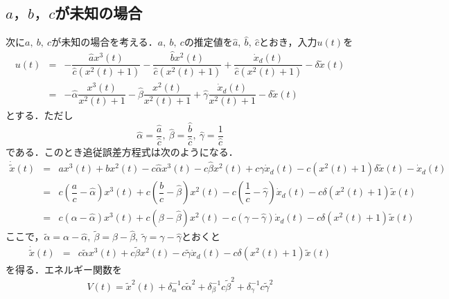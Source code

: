 \documentclass[a4paper,12pt]{jarticle}
\begin{document}
\subsection{$ a，b，c $が未知の場合}
次に$ a, ~ b, ~ c $が未知の場合を考える．$ a, ~ b, ~ c $の推定値を$ \hat{a}, ~ \hat{b}, ~ \hat{c} $とおき，入力$ u(t) $を
\begin{eqnarray}
 u(t) & = & -\dfrac{\hat{a}x^3(t)}{\hat{c}\left( x^2(t) + 1 \right)} - \dfrac{\hat{b}x^2(t)}{\hat{c}\left( x^2(t) + 1 \right)} +\dfrac{\dot{x}_d(t)}{\hat{c}\left( x^2(t) + 1 \right)} - \delta \tilde{x}(t) \nonumber\\
      & = & - \hat{\alpha}\dfrac{x^3(t)}{x^2(t) + 1} - \hat{\beta}\dfrac{x^2(t)}{x^2(t) + 1} +\hat{\gamma}\dfrac{\dot{x}_d(t)}{x^2(t) + 1} - \delta \tilde{x}(t)
\end{eqnarray}
とする．ただし
\begin{equation}
 \hat{\alpha} = \dfrac{\hat{a}}{\hat{c}}, ~ \hat{\beta} = \dfrac{\hat{b}}{\hat{c}}, ~ \hat{\gamma} = \dfrac{1}{\hat{c}}
\end{equation}
である．このとき追従誤差方程式は次のようになる．
\begin{eqnarray}
 \dot{\tilde{x}}(t) & = & ax^3(t) + bx^2(t) -c \hat{\alpha}x^3(t) - c\hat{\beta}x^2(t) + c\hat{\gamma}\dot{x}_d(t) - c\left( x^2(t) + 1 \right) \delta \tilde{x}(t) - \dot{x}_d(t) \nonumber \\
                 & = & c \left( \dfrac{a}{c} - \hat{\alpha} \right)x^3(t) + c \left( \dfrac{b}{c} - \hat{\beta} \right)x^2(t) - c \left( \dfrac{1}{c} - \hat{\gamma} \right)\dot{x}_d(t) - c \delta \left( x^2(t) + 1 \right)\tilde{x}(t) \nonumber \\
                 & = & c \left( \alpha - \hat{\alpha} \right)x^3(t) + c \left( \beta - \hat{\beta} \right) x^2(t) - c \left( \gamma - \hat{\gamma} \right)\dot{x}_d(t) - c \delta \left( x^2(t) + 1 \right)\tilde{x}(t)
\end{eqnarray}
ここで，$ \tilde{\alpha} = \alpha - \hat{\alpha}, ~ \tilde{\beta} = \beta - \hat{\beta}, ~ \tilde{\gamma} = \gamma - \hat{\gamma} $とおくと
\begin{eqnarray}
 \dot{\tilde{x}}(t) & = & c \tilde{\alpha} x^3(t) + c \tilde{\beta} x^2(t) - c \tilde{\gamma} \dot{x}_d(t) - c \delta \left( x^2(t) + 1 \right)\tilde{x}(t)
\end{eqnarray}
を得る．エネルギー関数を
\begin{equation}
 V(t) = \tilde{x}^2(t) + \delta_{\alpha}^{-1} c \tilde{\alpha}^2 + \delta_{\beta}^{-1} c \tilde{\beta}^2 + \delta_{\gamma}^{-1} c \tilde{\gamma}^2
\end{equation}
\end{document}
